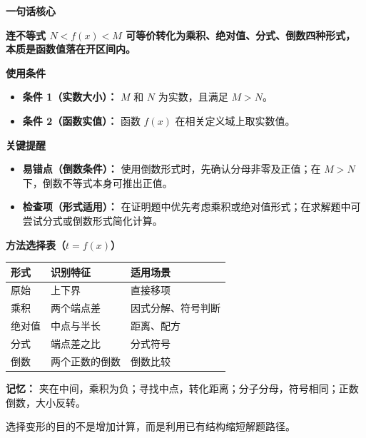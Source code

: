 \begin{summarybox}
\textbf{\textcolor{CSummary}{一句话核心}}

\textbf{连不等式 $N < f(x) < M$ 可等价转化为乘积、绝对值、分式、倒数四种形式，本质是函数值落在开区间内。}

\medskip
\textbf{\textcolor{CSummary}{使用条件}}
\begin{itemize}[leftmargin=*, itemsep=0.5em, topsep=0.4em]
    \item \textbf{条件 1（实数大小）：} $M$ 和 $N$ 为实数，且满足 $M > N$。
    \item \textbf{条件 2（函数实值）：} 函数 $f(x)$ 在相关定义域上取实数值。
\end{itemize}

\medskip
\textbf{\textcolor{CSummary}{关键提醒}}
\begin{itemize}[leftmargin=*, itemsep=0.5em, topsep=0.4em]
    \item \textbf{易错点（倒数条件）：} 使用倒数形式时，先确认分母非零及正值；在 $M>N$ 下，倒数不等式本身可推出正值。
    \item \textbf{检查项（形式适用）：} 在证明题中优先考虑乘积或绝对值形式；在求解题中可尝试分式或倒数形式简化计算。
\end{itemize}
\medskip
\textbf{方法选择表（$t=f(x)$）}
\begin{center}
\begin{tabular}{lll}
形式 & 识别特征 & 适用场景\\\hline
原始 & 上下界 & 直接移项\\
乘积 & 两个端点差 & 因式分解、符号判断\\
绝对值 & 中点与半长 & 距离、配方\\
分式 & 端点差之比 & 分式符号\\
倒数 & 两个正数的倒数 & 倒数比较
\end{tabular}
\end{center}
\textbf{记忆：} 夹在中间，乘积为负；寻找中点，转化距离；分子分母，符号相同；正数倒数，大小反转。

选择变形的目的不是增加计算，而是利用已有结构缩短解题路径。
\end{summarybox}
